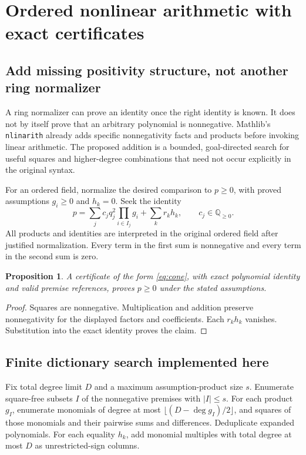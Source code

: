 \documentclass[11pt,a4paper]{article}
\newtheorem{proposition}{Proposition}[section]
\newcommand{\Q}{\mathbb{Q}}
\begin{document}
\section{Ordered nonlinear arithmetic with exact certificates}
\label{sec:sos}

\subsection{Add missing positivity structure, not another ring normalizer}

A ring normalizer can prove an identity once the right identity is known. It does not by itself prove that an arbitrary polynomial is nonnegative. Mathlib's \texttt{nlinarith} already adds specific nonnegativity facts and products before invoking linear arithmetic. The proposed addition is a bounded, goal-directed search for useful squares and higher-degree combinations that need not occur explicitly in the original syntax.\cite{nlinarith,positivity}

For an ordered field, normalize the desired comparison to $p\geq0$, with proved assumptions $g_i\geq0$ and $h_k=0$. Seek the identity
\begin{equation}
 p=\sum_j c_jq_j^2\prod_{i\in I_j}g_i
      +\sum_k r_kh_k,
 \qquad c_j\in\Q_{\geq0}.
\label{eq:cone}
\end{equation}
All products and identities are interpreted in the original ordered field after justified normalization. Every term in the first sum is nonnegative and every term in the second sum is zero.

\begin{proposition}
A certificate of the form \eqref{eq:cone}, with exact polynomial identity and valid premise references, proves $p\geq0$ under the stated assumptions.
\end{proposition}
\begin{proof}
Squares are nonnegative. Multiplication and addition preserve nonnegativity for the displayed factors and coefficients. Each $r_kh_k$ vanishes. Substitution into the exact identity proves the claim.
\end{proof}

\subsection{Finite dictionary search implemented here}

Fix total degree limit $D$ and a maximum assumption-product size $s$. Enumerate square-free subsets $I$ of the nonnegative premises with $|I|\leq s$. For each product $g_I$, enumerate monomials of degree at most $\lfloor(D-\deg g_I)/2\rfloor$, and squares of those monomials and their pairwise sums and differences. Deduplicate expanded polynomials. For each equality $h_k$, add monomial multiples with total degree at most $D$ as unrestricted-sign columns.
\end{document}
